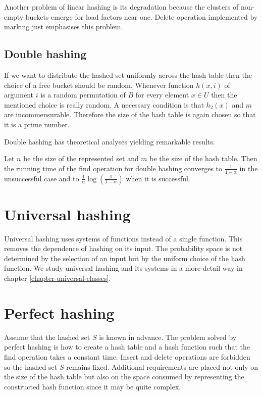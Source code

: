 Another problem of linear hashing is its degradation because the clusters of non-empty buckets emerge for load factors near one. Delete operation implemented by marking just emphasises this problem.

\subsection{Double hashing}
If we want to distribute the hashed set uniformly across the hash table then the choice of a free bucket should be random. Whenever function $h(x, i)$ of argument $i$ is a random permutation of $B$ for every element $x \in U$ then the mentioned choice is really random. A necessary condition is that $h_2(x)$ and $m$ are incommensurable. Therefore the size of the hash table is again chosen so that it is a prime number. 

Double hashing has theoretical analyses yielding remarkable results.
\begin{theorem}
Let $n$ be the size of the represented set and $m$ be the size of the hash table. Then the running time of the find operation for double hashing converges to $\frac{1}{1 - \alpha}$ in the unsuccessful case and to $\frac{1}{\alpha}\log\left(\frac{1}{1 - \alpha}\right)$ when it is successful.
\end{theorem}

\section{Universal hashing}
Universal hashing uses systems of functions instead of a single function. This removes the dependence of hashing on its input. The probability space is not determined by the selection of an input but by the uniform choice of the hash function. We study universal hashing and its systems in a more detail way in chapter \ref{chapter-universal-classes}.

\section{Perfect hashing}
Assume that the hashed set $S$ is known in advance. The problem solved by perfect hashing is how to create a hash table and a hash function such that the find operation takes a constant time. Insert and delete operations are forbidden so the hashed set $S$ remains fixed. Additional requirements are placed not only on the size of the hash table but also on the space consumed by representing the constructed hash function since it may be quite complex.

